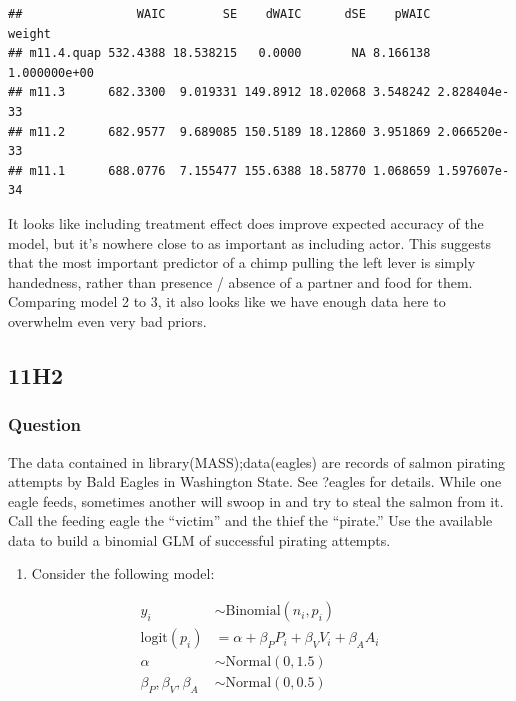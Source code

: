 \documentclass[
]{book}
\providecommand{\tightlist}{%
  \setlength{\itemsep}{0pt}\setlength{\parskip}{0pt}}
\begin{document}
\begin{verbatim}
##                WAIC        SE    dWAIC      dSE    pWAIC       weight
## m11.4.quap 532.4388 18.538215   0.0000       NA 8.166138 1.000000e+00
## m11.3      682.3300  9.019331 149.8912 18.02068 3.548242 2.828404e-33
## m11.2      682.9577  9.689085 150.5189 18.12860 3.951869 2.066520e-33
## m11.1      688.0776  7.155477 155.6388 18.58770 1.068659 1.597607e-34
\end{verbatim}

It looks like including treatment effect does improve expected accuracy of the model, but it's nowhere close to as important as including actor. This suggests that the most important predictor of a chimp pulling the left lever is simply handedness, rather than presence / absence of a partner and food for them. Comparing model 2 to 3, it also looks like we have enough data here to overwhelm even very bad priors.

\hypertarget{h2-4}{%
\subsection*{11H2}\label{h2-4}}

\hypertarget{question-94}{%
\subsubsection*{Question}\label{question-94}}

The data contained in library(MASS);data(eagles) are records of salmon pirating attempts by Bald Eagles in Washington State. See ?eagles for details. While one eagle feeds, sometimes another will swoop in and try to steal the salmon from it. Call the feeding eagle the ``victim'' and the thief the ``pirate.'' Use the available data to build a binomial GLM of successful pirating attempts.

\begin{enumerate}
\def\labelenumi{(\alph{enumi})}
\tightlist
\item
  Consider the following model:
\end{enumerate}

\[
\begin{aligned}
y_i &\sim \text{Binomial}(n_i,p_i) \\
\text{logit}(p_i) &=  \alpha + \beta_P P_i + \beta_V V_i + \beta_A A_i \\
\alpha &\sim \text{Normal}(0,1.5) \\
\beta_P, \beta_V, \beta_A &\sim \text{Normal}(0,0.5) 
\end{aligned}
\]
\end{document}
